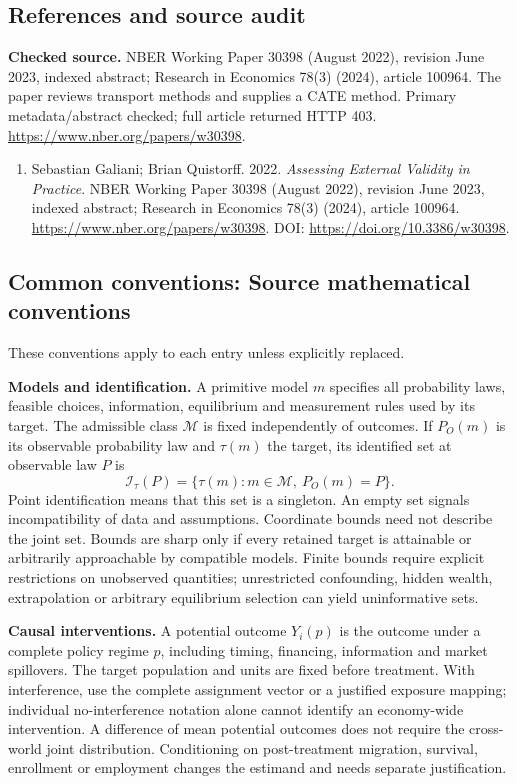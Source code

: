 \documentclass[11pt,a4paper]{article}
\begin{document}
\subsection*{References and source audit}
\textbf{Checked source.} NBER Working Paper 30398 (August 2022), revision June 2023, indexed abstract; Research in Economics 78(3) (2024), article 100964. The paper reviews transport methods and supplies a CATE method. Primary metadata/abstract checked; full article returned HTTP 403. \url{https://www.nber.org/papers/w30398}.
\begin{enumerate}\raggedright
\item\hypertarget{definitions:source:30007702:1}{} Sebastian Galiani; Brian Quistorff. 2022. \emph{Assessing External Validity in Practice}. NBER Working Paper 30398 (August 2022), revision June 2023, indexed abstract; Research in Economics 78(3) (2024), article 100964.
\url{https://www.nber.org/papers/w30398}.
DOI: \url{https://doi.org/10.3386/w30398}.
\end{enumerate}

\subsection*{Common conventions: Source mathematical conventions}

These conventions apply to each entry unless explicitly replaced.

\textbf{Models and identification.} A primitive model \(m\) specifies all probability laws, feasible choices, information, equilibrium and measurement rules used by its target. The admissible class \(\mathcal M\) is fixed independently of outcomes. If \(P_O(m)\) is its observable probability law and \(\tau(m)\) the target, its identified set at observable law \(P\) is
\[
 \mathcal I_\tau(P)=\{\tau(m):m\in\mathcal M,\ P_O(m)=P\}.
\]
Point identification means that this set is a singleton. An empty set signals incompatibility of data and assumptions. Coordinate bounds need not describe the joint set. Bounds are sharp only if every retained target is attainable or arbitrarily approachable by compatible models. Finite bounds require explicit restrictions on unobserved quantities; unrestricted confounding, hidden wealth, extrapolation or arbitrary equilibrium selection can yield uninformative sets.

\textbf{Causal interventions.} A potential outcome \(Y_i(p)\) is the outcome under a complete policy regime \(p\), including timing, financing, information and market spillovers. The target population and units are fixed before treatment. With interference, use the complete assignment vector or a justified exposure mapping; individual no-interference notation alone cannot identify an economy-wide intervention. A difference of mean potential outcomes does not require the cross-world joint distribution. Conditioning on post-treatment migration, survival, enrollment or employment changes the estimand and needs separate justification.
\end{document}
